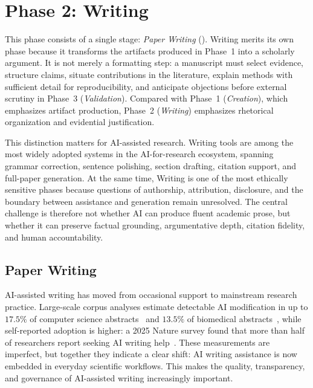 \section{Phase 2: Writing}
\label{sec:writing_phase}

This phase consists of a single stage: \emph{Paper Writing} (\Sfive). Writing merits its own phase because it transforms the artifacts produced in Phase~1 into a scholarly argument. It is not merely a formatting step: a manuscript must select evidence, structure claims, situate contributions in the literature, explain methods with sufficient detail for reproducibility, and anticipate objections before external scrutiny in Phase~3 (\emph{Validation}). Compared with Phase~1 (\emph{Creation}), which emphasizes artifact production, Phase~2 (\emph{Writing}) emphasizes rhetorical organization and evidential justification.

This distinction matters for AI-assisted research. Writing tools are among the most widely adopted systems in the AI-for-research ecosystem, spanning grammar correction, sentence polishing, section drafting, citation support, and full-paper generation. At the same time, Writing is one of the most ethically sensitive phases because questions of authorship, attribution, disclosure, and the boundary between assistance and generation remain unresolved. The central challenge is therefore not whether AI can produce fluent academic prose, but whether it can preserve factual grounding, argumentative depth, citation fidelity, and human accountability.



\subsection{Paper Writing}
\label{sec:writing}

AI-assisted writing has moved from occasional support to mainstream research practice. Large-scale corpus analyses estimate detectable AI modification in up to $17.5\%$ of computer science abstracts~\cite{liang2024mapping} and $13.5\%$ of biomedical abstracts~\cite{kobak2024delve}, while self-reported adoption is higher: a 2025 Nature survey found that more than half of researchers report seeking AI writing help~\cite{aireviewsurvey2025}. These measurements are imperfect, but together they indicate a clear shift: AI writing assistance is now embedded in everyday scientific workflows. This makes the quality, transparency, and governance of AI-assisted writing increasingly important.

